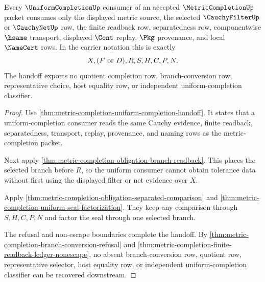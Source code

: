 \begin{theorem}
\label{thm:metriccompletion-uniform-completion-handoff}
Every $\UniformCompletionUp$ consumer of an accepted $\MetricCompletionUp$ packet consumes only the displayed metric source, the selected $\CauchyFilterUp$ or $\CauchyNetUp$ row, the finite readback row, separatedness row, componentwise $\hsame$ transport, displayed $\Cont$ replay, $\Pkg$ provenance, and local $\NameCert$ rows. In the carrier notation this is exactly
$$
X,(F\ \hbox{or}\ D),R,S,H,C,P,N .
$$
The handoff exports no quotient completion row, branch-conversion row, representative choice, host equality row, or independent uniform-completion classifier.
\end{theorem}
\begin{proof}
Use \autoref{thm:metric-completion-uniform-completion-handoff}. It states that a uniform-completion consumer reads the same Cauchy evidence, finite readback, separatedness, transport, replay, provenance, and naming rows as the metric-completion packet.

Next apply \autoref{thm:metric-completion-obligation-branch-readback}. This places the selected branch before $R$, so the uniform consumer cannot obtain tolerance data without first using the displayed filter or net evidence over $X$.

Apply \autoref{thm:metric-completion-obligation-separated-comparison} and \autoref{thm:metric-completion-uniform-seal-factorization}. They keep any comparison through $S,H,C,P,N$ and factor the seal through one selected branch.

The refusal and non-escape boundaries complete the handoff. By \autoref{thm:metric-completion-branch-conversion-refusal} and \autoref{thm:metric-completion-finite-readback-ledger-nonescape}, no absent branch-conversion row, quotient row, representative selector, host equality row, or independent uniform-completion classifier can be recovered downstream.
\end{proof}

